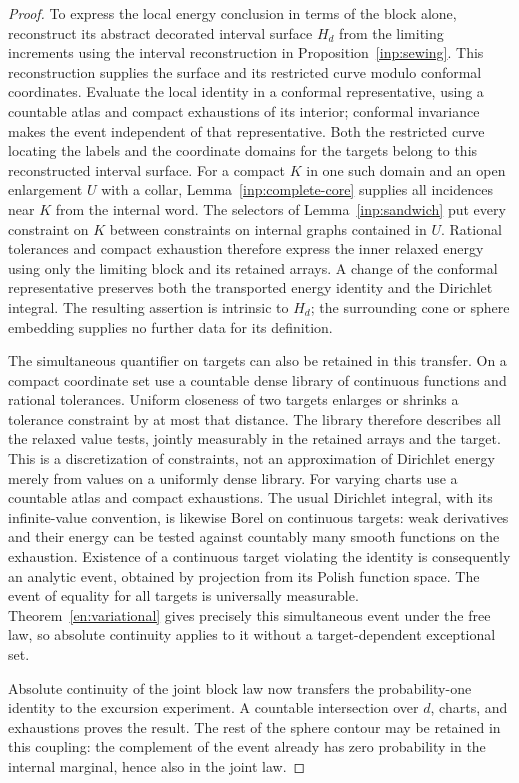 \begin{proof}
To express the local energy conclusion in terms of the block alone,
reconstruct its abstract decorated interval surface $H_d$ from the
limiting increments using the interval reconstruction in
Proposition~\ref{inp:sewing}.  This reconstruction supplies the surface
and its restricted curve modulo conformal coordinates.  Evaluate
the local identity in a conformal representative, using a countable
atlas and compact exhaustions of its interior; conformal invariance
makes the event independent of that representative.  Both the
restricted curve locating the labels and the coordinate domains for
the targets belong to this reconstructed interval surface.
For a compact $K$ in one such domain and an open enlargement
$U$ with a collar, Lemma~\ref{inp:complete-core} supplies all incidences
near $K$ from the internal word.  The selectors of
Lemma~\ref{inp:sandwich} put every constraint on $K$ between
constraints on internal graphs contained in $U$.  Rational tolerances
and compact exhaustion therefore express the inner relaxed energy
using only the limiting block and its retained arrays.  A change of
the conformal representative preserves both the transported energy
identity and the Dirichlet integral.  The resulting assertion is
intrinsic to $H_d$; the surrounding cone or sphere embedding supplies
no further data for its definition.

The simultaneous quantifier on targets can also be retained in this
transfer.  On a compact coordinate set use a countable dense library
of continuous functions and rational tolerances.  Uniform closeness
of two targets enlarges or shrinks a tolerance constraint by at most
that distance.  The library therefore describes all the relaxed
value tests, jointly measurably in the retained arrays and the target.
This is a discretization of constraints, not an approximation of
Dirichlet energy merely from values on a uniformly dense library.
For varying charts use a countable atlas and compact exhaustions.
The usual Dirichlet integral, with its infinite-value convention,
is likewise Borel on continuous targets: weak derivatives and their
energy can be tested against countably many smooth functions on the
exhaustion.  Existence of a continuous target violating the identity
is consequently an analytic event, obtained by projection from its
Polish function space.  The event of equality for all targets is
universally measurable.  Theorem~\ref{en:variational} gives precisely
this simultaneous event under the free law, so absolute continuity
applies to it without a target-dependent exceptional set.

Absolute continuity of the joint block law now transfers the
probability-one identity to the excursion experiment.  A countable
intersection over $d$, charts, and exhaustions proves the result.
The rest of the sphere contour may be retained in this coupling: the
complement of the event already has zero probability in the internal
marginal, hence also in the joint law.
\end{proof}

